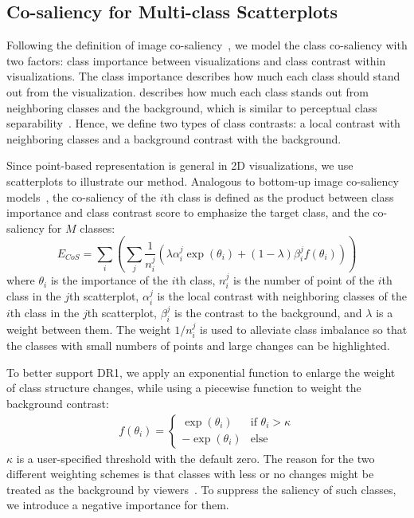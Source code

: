\subsection{Co-saliency for Multi-class Scatterplots }
Following the definition of image co-saliency~\cite{Jacobs10}, we model the class co-saliency with two factors: class importance between visualizations and class contrast within visualizations. The class importance describes how much each class should stand out from the visualization.
describes how much each class stands out from neighboring classes and the background,
which is similar to perceptual class separability~\cite{Aupetit02,Wang2018}. Hence,
we define two types of class contrasts: a local contrast with neighboring classes and a background contrast with the background.

Since point-based representation is general in 2D visualizations, we use scatterplots to illustrate our method.
Analogous to bottom-up image co-saliency models~\cite{Jacobs10,Fu13}, the co-saliency of the $i$th class is defined as the product between class importance and  class contrast score to emphasize the target class, and the co-saliency for $M$ classes:
\begin{equation}
E_{CoS} = \sum_i    \left(\sum_j \frac{1}{n^j_i}(\lambda \alpha^j_i\exp(\theta_i) + (1-\lambda) \beta^j_i f(\theta_i) ) \right)
	\label{eq:cosaliency}
\end{equation}
where $\theta_i$ is the importance of the $i$th class,
$n^j_i$ is the number of point of the $i$th class in the $j$th scatterplot,
$\alpha^j_i$ is the local contrast with neighboring classes of the $i$th class in the $j$th scatterplot, $\beta^j_i$  is the contrast to the background, and $\lambda$ is a weight between them. The weight $1/{n^j_i}$  is used to alleviate class imbalance  so that the classes with small numbers of points and large changes can be highlighted.

To better support DR1, we apply an exponential function to enlarge the weight of class structure changes, while using a piecewise function to weight the background contrast:
\begin{align}
f(\theta_i) =  \left\{ \begin{array}{ll}
\exp(\theta_i) & \textrm{if $\theta_i>\kappa$}\\
-\exp(\theta_i) & \textrm{else}
\end{array} \right.
\label{eq:energyfunc}
\end{align}
$\kappa$ is a user-specified threshold with the default zero. The reason for the two different weighting schemes is that classes with less or no changes might be treated as the background by viewers~\cite{zhang2018review}. To suppress the saliency of such classes, we introduce a negative importance for them.


